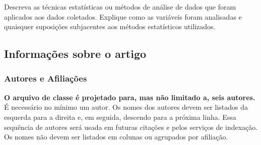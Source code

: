 Descreva as técnicas estatísticas ou métodos de análise de dados que foram aplicados aos dados coletados. Explique como as variáveis foram analisadas e quaisquer suposições subjacentes aos métodos estatísticos utilizados.


\subsection{Informações sobre o artigo}

\subsubsection{Autores e Afiliações}
\textbf{O arquivo de classe é projetado para, mas não limitado a, seis autores.} É necessário no mínimo um autor. Os nomes dos autores devem ser listados da esquerda para a direita e, em seguida, descendo para a próxima linha. Essa sequência de autores será usada em futuras citações e pelos serviços de indexação. Os nomes não devem ser listados em colunas ou agrupados por afiliação.